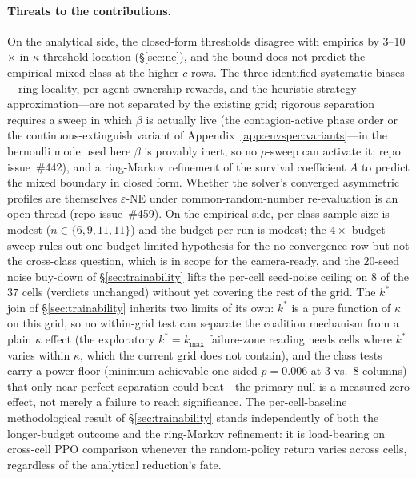 \documentclass{anvil-paper}
\begin{document}
\paragraph{Threats to the contributions.}
On the analytical side, the closed-form thresholds disagree with
empirics by 3--10$\times$ in $\kappa$-threshold location
(\S\ref{sec:ne}), and the bound does not predict the empirical
\textsf{mixed} class at the higher-$c$ rows. The three identified
systematic biases---ring locality, per-agent ownership rewards, and the
heuristic-strategy approximation---are not separated by the existing
grid; rigorous separation requires a sweep in which $\beta$ is actually
live (the contagion-active phase order or the continuous-extinguish
variant of Appendix~\ref{app:envspec:variants}---in the bernoulli mode
used here $\beta$ is provably inert, so no $\rho$-sweep can activate it;
repo issue~\#442), and a
ring-Markov refinement of the survival coefficient $A$ to predict the
\textsf{mixed} boundary in closed form. Whether the solver's converged
asymmetric profiles are themselves $\varepsilon$-NE under
common-random-number re-evaluation is an open thread (repo
issue~\#459). On the empirical side, per-class
sample size is modest ($n\in\{6,9,11,11\}$) and the budget per run is
modest; the $4{\times}$-budget sweep rules out one budget-limited
hypothesis for the no-convergence row but not the cross-class question,
which is in scope for the camera-ready, and the $20$-seed noise
buy-down of \S\ref{sec:trainability} lifts the per-cell seed-noise
ceiling on $8$ of the $37$ cells (verdicts unchanged) without yet
covering the rest of the grid. The $k^{*}$ join of
\S\ref{sec:trainability} inherits two limits of its own: $k^{*}$ is a
pure function of $\kappa$ on this grid, so no within-grid test can
separate the coalition mechanism from a plain $\kappa$ effect (the
exploratory $k^{*}{=}k_{\max}$ failure-zone reading needs cells where
$k^{*}$ varies within $\kappa$, which the current grid does not
contain), and the class tests carry a power floor (minimum achievable
one-sided $p{=}0.006$ at $3$ vs.\ $8$ columns) that only near-perfect
separation could beat---the primary null is a measured zero effect,
not merely a failure to reach significance. The per-cell-baseline
methodological result of \S\ref{sec:trainability} stands independently
of both the longer-budget outcome and the ring-Markov refinement: it is
load-bearing on cross-cell PPO comparison whenever the random-policy
return varies across cells, regardless of the analytical reduction's
fate.
\end{document}
